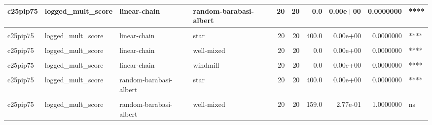 \documentclass[
]{book}
\begin{document}
\begin{table}
\begin{tabular}{l|l|l|l|r|r|r|r|r|l}
\hline
c25pip75 & logged\_mult\_score & linear-chain & random-barabasi-albert & 20 & 20 & 0.0 & 0.00e+00 & 0.0000000 & ****\\
\hline
\cellcolor{gray!6}{c25pip75} & \cellcolor{gray!6}{logged\_mult\_score} & \cellcolor{gray!6}{linear-chain} & \cellcolor{gray!6}{random-waxman} & \cellcolor{gray!6}{20} & \cellcolor{gray!6}{20} & \cellcolor{gray!6}{0.0} & \cellcolor{gray!6}{0.00e+00} & \cellcolor{gray!6}{0.0000000} & \cellcolor{gray!6}{****}\\
\hline
c25pip75 & logged\_mult\_score & linear-chain & star & 20 & 20 & 400.0 & 0.00e+00 & 0.0000000 & ****\\
\hline
\cellcolor{gray!6}{c25pip75} & \cellcolor{gray!6}{logged\_mult\_score} & \cellcolor{gray!6}{linear-chain} & \cellcolor{gray!6}{toroidal-lattice} & \cellcolor{gray!6}{20} & \cellcolor{gray!6}{20} & \cellcolor{gray!6}{0.0} & \cellcolor{gray!6}{0.00e+00} & \cellcolor{gray!6}{0.0000000} & \cellcolor{gray!6}{****}\\
\hline
c25pip75 & logged\_mult\_score & linear-chain & well-mixed & 20 & 20 & 0.0 & 0.00e+00 & 0.0000000 & ****\\
\hline
\cellcolor{gray!6}{c25pip75} & \cellcolor{gray!6}{logged\_mult\_score} & \cellcolor{gray!6}{linear-chain} & \cellcolor{gray!6}{wheel} & \cellcolor{gray!6}{20} & \cellcolor{gray!6}{20} & \cellcolor{gray!6}{9.0} & \cellcolor{gray!6}{0.00e+00} & \cellcolor{gray!6}{0.0000004} & \cellcolor{gray!6}{****}\\
\hline
c25pip75 & logged\_mult\_score & linear-chain & windmill & 20 & 20 & 0.0 & 0.00e+00 & 0.0000000 & ****\\
\hline
\cellcolor{gray!6}{c25pip75} & \cellcolor{gray!6}{logged\_mult\_score} & \cellcolor{gray!6}{random-barabasi-albert} & \cellcolor{gray!6}{random-waxman} & \cellcolor{gray!6}{20} & \cellcolor{gray!6}{20} & \cellcolor{gray!6}{230.0} & \cellcolor{gray!6}{4.29e-01} & \cellcolor{gray!6}{1.0000000} & \cellcolor{gray!6}{ns}\\
\hline
c25pip75 & logged\_mult\_score & random-barabasi-albert & star & 20 & 20 & 400.0 & 0.00e+00 & 0.0000000 & ****\\
\hline
\cellcolor{gray!6}{c25pip75} & \cellcolor{gray!6}{logged\_mult\_score} & \cellcolor{gray!6}{random-barabasi-albert} & \cellcolor{gray!6}{toroidal-lattice} & \cellcolor{gray!6}{20} & \cellcolor{gray!6}{20} & \cellcolor{gray!6}{395.0} & \cellcolor{gray!6}{0.00e+00} & \cellcolor{gray!6}{0.0000001} & \cellcolor{gray!6}{****}\\
\hline
c25pip75 & logged\_mult\_score & random-barabasi-albert & well-mixed & 20 & 20 & 159.0 & 2.77e-01 & 1.0000000 & ns\\

\end{tabular}
\end{table}
\end{document}
